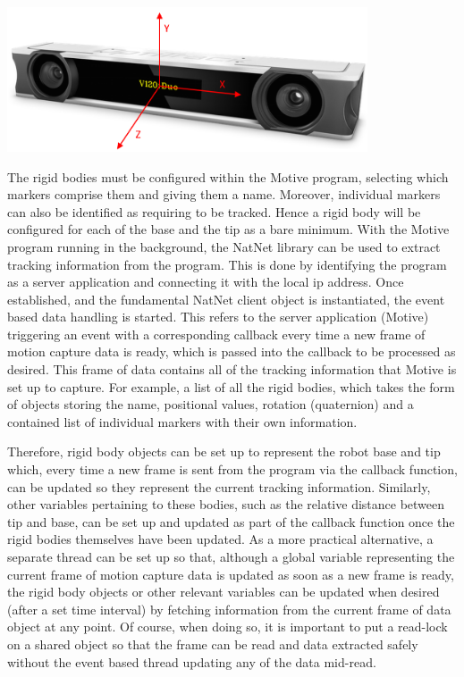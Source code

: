 \documentclass[11pt]{article}
\begin{document}
\begin{center}
\includegraphics[width=0.8\textwidth]{images/duoAxes.png}
\label{figure:duoAxes}
\end{center}

The rigid bodies must be configured within the Motive program, selecting which markers comprise them and giving them a name. Moreover, individual markers can also be identified as requiring to be tracked. Hence a rigid body will be configured for each of the base and the tip as a bare minimum. With the Motive program running in the background, the NatNet library can be used to extract tracking information from the program. This is done by identifying the program as a server application and connecting it with the local ip address. Once established, and the fundamental NatNet client object is instantiated, the event based data handling is started. This refers to the server application (Motive) triggering an event with a corresponding callback every time a new frame of motion capture data is ready, which is passed into the callback to be processed as desired. This frame of data contains all of the tracking information that Motive is set up to capture. For example, a list of all the rigid bodies, which takes the form of objects storing the name, positional values, rotation (quaternion) and a contained list of individual markers with their own information.

Therefore, rigid body objects can be set up to represent the robot base and tip which, every time a new frame is sent from the program via the callback function, can be updated so they represent the current tracking information. Similarly, other variables pertaining to these bodies, such as the relative distance between tip and base, can be set up and updated as part of the callback function once the rigid bodies themselves have been updated. As a more practical alternative, a separate thread can be set up so that, although a global variable representing the current frame of motion capture data is updated as soon as a new frame is ready, the rigid body objects or other relevant variables can be updated when desired (after a set time interval) by fetching information from the current frame of data object at any point. Of course, when doing so, it is important to put a read-lock on a shared object so that the frame can be read and data extracted safely without the event based thread updating any of the data mid-read.
\end{document}

